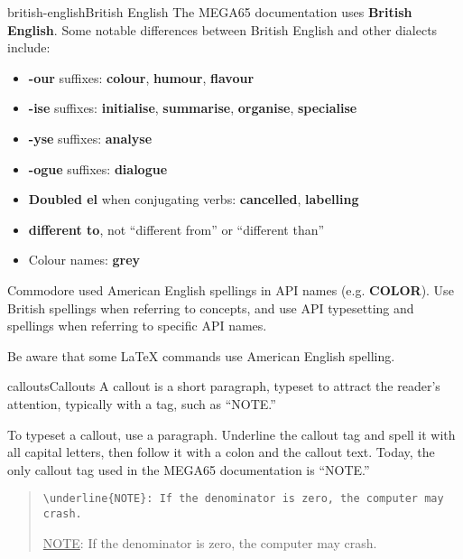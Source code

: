 \begin{sgentry}{british-english}{British English}
    The MEGA65 documentation uses \textbf{British English}. Some notable differences between British English and other dialects include:

    \begin{itemize}
        \item \textbf{-our} suffixes: \textbf{colour}, \textbf{humour}, \textbf{flavour}
        \item \textbf{-ise} suffixes: \textbf{initialise}, \textbf{summarise}, \textbf{organise}, \textbf{specialise}
        \item \textbf{-yse} suffixes: \textbf{analyse}
        \item \textbf{-ogue} suffixes: \textbf{dialogue}
        \item \textbf{Doubled el} when conjugating verbs: \textbf{cancelled}, \textbf{labelling}
        \item \textbf{different to}, not ``different from'' or ``different than''
        \item Colour names: \textbf{grey}
    \end{itemize}

    Commodore used American English spellings in API names (e.g. \textbf{COLOR}). Use British spellings when referring to concepts, and use API typesetting and spellings when referring to specific API names.

    Be aware that some LaTeX commands use American English spelling.
\end{sgentry}

\begin{sgentry}{callouts}{Callouts}
    A callout is a short paragraph, typeset to attract the reader's attention, typically with a tag, such as ``NOTE.''

    To typeset a callout, use a paragraph. Underline the callout tag and spell it with all capital letters, then follow it with a colon and the callout text. Today, the only callout tag used in the MEGA65 documentation is ``NOTE.''

    \begin{quote}
        \texttt{{\textbackslash}underline\{NOTE\}: If the denominator is zero, the computer may crash.}

        \hrulefill

        \underline{NOTE}: If the denominator is zero, the computer may crash.
    \end{quote}
\end{sgentry}

